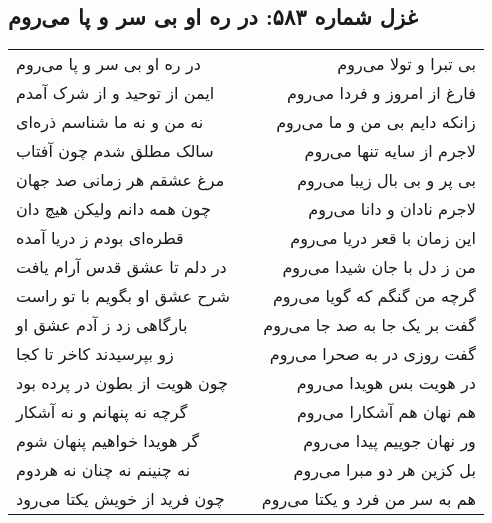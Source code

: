 \begin{center}
\section*{غزل شماره ۵۸۳: در ره او بی سر و پا می‌روم}
\label{sec:583}
\begin{longtable}{l p{0.5cm} r}
در ره او بی سر و پا می‌روم
&&
بی تبرا و تولا می‌روم
\\
ایمن از توحید و از شرک آمدم
&&
فارغ از امروز و فردا می‌روم
\\
نه من و نه ما شناسم ذره‌ای
&&
زانکه دایم بی من و ما می‌روم
\\
سالک مطلق شدم چون آفتاب
&&
لاجرم از سایه تنها می‌روم
\\
مرغ عشقم هر زمانی صد جهان
&&
بی پر و بی بال زیبا می‌روم
\\
چون همه دانم ولیکن هیچ دان
&&
لاجرم نادان و دانا می‌روم
\\
قطره‌ای بودم ز دریا آمده
&&
این زمان با قعر دریا می‌روم
\\
در دلم تا عشق قدس آرام یافت
&&
من ز دل با جان شیدا می‌روم
\\
شرح عشق او بگویم با تو راست
&&
گرچه من گنگم که گویا می‌روم
\\
بارگاهی زد ز آدم عشق او
&&
گفت بر یک جا به صد جا می‌روم
\\
زو بپرسیدند کاخر تا کجا
&&
گفت روزی در به صحرا می‌روم
\\
چون هویت از بطون در پرده بود
&&
در هویت بس هویدا می‌روم
\\
گرچه نه پنهانم و نه آشکار
&&
هم نهان هم آشکارا می‌روم
\\
گر هویدا خواهیم پنهان شوم
&&
ور نهان جوییم پیدا می‌روم
\\
نه چنینم نه چنان نه هردوم
&&
بل کزین هر دو مبرا می‌روم
\\
چون فرید از خویش یکتا می‌رود
&&
هم به سر من فرد و یکتا می‌روم
\\
\end{longtable}
\end{center}
